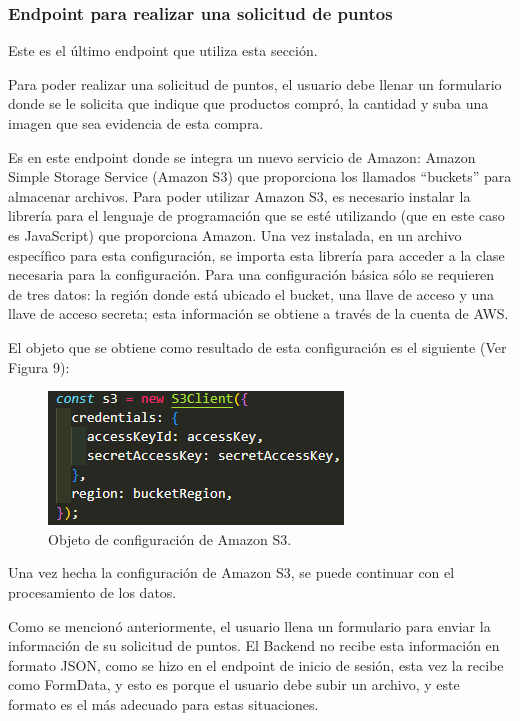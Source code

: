 \subsubsection{Endpoint para realizar una solicitud de puntos}
Este es el último endpoint que utiliza esta sección.

Para poder realizar una solicitud de puntos, el usuario debe llenar un formulario donde se le solicita que indique que productos compró, la cantidad y suba una imagen que sea evidencia de esta compra.

Es en este endpoint donde se integra un nuevo servicio de Amazon: Amazon Simple Storage Service (Amazon S3) que proporciona los llamados ``buckets'' para almacenar archivos. Para poder utilizar Amazon S3, es necesario instalar la librería para el lenguaje de programación que se esté utilizando (que en este caso es JavaScript) que proporciona Amazon. Una vez instalada, en un archivo específico para esta configuración, se importa esta librería para acceder a la clase necesaria para la configuración. Para una configuración básica sólo se requieren de tres datos: la región donde está ubicado el bucket, una llave de acceso y una llave de acceso secreta; esta información se obtiene a través de la cuenta de AWS.

El objeto que se obtiene como resultado de esta configuración es el siguiente (Ver Figura 9):

    \begin{figure}[H]
        \begin{center}
            \includegraphics[scale=0.85]{img/actividades/detalles-campanias/objeto-as3.png}
            \caption{Objeto de configuración de Amazon S3.}
            \label{fig:objeto-as3}
        \end{center}
    \end{figure}

Una vez hecha la configuración de Amazon S3, se puede continuar con el procesamiento de los datos.

Como se mencionó anteriormente, el usuario llena un formulario para enviar la información de su solicitud de puntos. El Backend no recibe esta información en formato JSON, como se hizo en el endpoint de inicio de sesión, esta vez la recibe como FormData, y esto es porque el usuario debe subir un archivo, y este formato es el más adecuado para estas situaciones.

